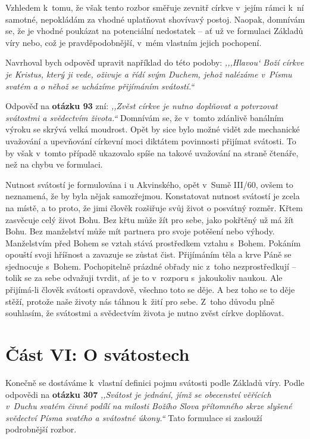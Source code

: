 Vzhledem k~tomu, že však tento rozbor směřuje zevnitř církve v~jejím rámci k~ní
samotné, nepokládám za vhodné uplatňovat shovívavý postoj. Naopak, domnívám se,
že je vhodné poukázat na potenciální nedostatek -- ať už ve formulaci Základů
víry nebo, což je pravděpodobnější, v~mém vlastním jejich pochopení.

Navrhoval bych odpověď upravit například do této podoby: \textit{,,,Hlavou` Boží
církve je Kristus, který ji vede, oživuje a řídí svým Duchem, jehož nalézáme
v~Písmu svatém a o něhož se ucházíme přijímáním svátostí.``}

Odpověď na \textbf{otázku 93} zní: \textit{,,Zvěst církve je nutno doplňovat a potvrzovat
svátostmi a svědectvím života.``} Domnívám se, že v~tomto zdánlivě banálním
výroku se skrývá velká moudrost. Opět by sice bylo možné vidět zde mechanické
uvažování a upevňování církevní moci diktátem povinnosti přijímat svátosti. To
by však v~tomto případě ukazovalo spíše na takové uvažování na straně čtenáře,
než na chybu ve formulaci.

Nutnost svátostí je formulována i u Akvinského, opět v~Sumě III/60, ovšem to
neznamená, že by byla nějak samozřejmou. Konstatovat nutnost svátostí je zcela
na místě, a to proto, že jimi člověk rozšiřuje svůj život o posvátný rozměr.
Křtem zasvěcuje celý život Bohu. Bez křtu může žít pro sebe, jako pokřtěný už má
žít Bohu. Bez manželství může mít partnera pro svoje potěšení nebo výhody.
Manželstvím před Bohem se vztah stává prostředkem vztahu s~Bohem. Pokáním
opouští svoji hříšnost a zavazuje se zůstat čist. Přijímáním těla a krve Páně se
sjednocuje s~Bohem. Pochopitelně prázdné obřady nic z~toho nezprostředkují --
tolik se za sebe odvažuji tvrdit, ať je to v~rozporu s~jakoukoliv naukou. Ale
přijímá-li člověk svátosti opravdově, všechno toto se děje. A bez toho se to
děje stěží, protože naše životy nás táhnou k~žití pro sebe. Z~toho důvodu plně
souhlasím, že svátostmi a svědectvím života je nutno zvěst církve doplňovat.

\section{Část VI: O svátostech}

Konečně se dostáváme k~vlastní definici pojmu svátosti podle Základů víry. Podle
odpovědi na \textbf{otázku 307}
\textit{,,Svátost je jednání, jímž se obecenství věřících v~Duchu svatém činně
podílí na milosti Božího Slova přítomného skrze slyšené svědectví Písma svatého
a svátostné úkony.``} Tato formulace si zaslouží podrobnější rozbor.

